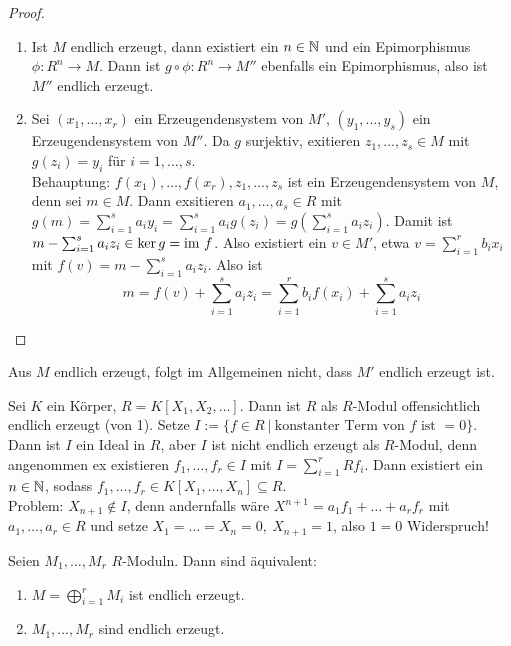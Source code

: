 \begin{proof}
	\begin{enumerate}[label=\alph*)]
		\item Ist $M$ endlich erzeugt, dann existiert ein $n\in \mathbb{N}$ und ein Epimorphismus $\phi:R^n \to M$. Dann ist $g\circ \phi:R^n \to M''$ ebenfalls ein Epimorphismus, also ist $M''$ endlich erzeugt.
		\item Sei $(x_1, \ldots, x_r)$ ein Erzeugendensystem von $M'$, $(y_1, \ldots, y_s)$ ein Erzeugendensystem von $M''$. Da $g$ surjektiv, exitieren $z_1, \ldots, z_s\in M$ mit $g(z_i) = y_i$ für $i=1, \ldots, s$. \\
		Behauptung: $f(x_1), \ldots, f(x_r), z_1, \ldots, z_s$ ist ein Erzeugendensystem von $M$, denn sei $m\in M$. Dann exsitieren $a_1, \ldots, a_s\in R$ mit $g(m) = \sum_{i=1}^s a_i y_i = \sum_{i=1}^s a_i g(z_i) = g(\sum_{i=1}^s a_i z_i)$. Damit ist $m- \sum_{i=1}^s a_i z_i \in \ker g = \operatorname{\text{im}\,} f$. Also existiert ein $v\in M'$, etwa $v= \sum_{i=1}^r b_i x_i$ mit $f(v) = m - \sum_{i=1}^s a_i z_i $. Also ist 
		$$m=f(v) + \sum_{i=1}^sa_i z_i = \sum_{i=1}^r b_i f(x_i) + \sum_{i=1}^s a_i z_i$$ 
	\end{enumerate}
\end{proof}
\begin{anm}
	Aus $M$ endlich erzeugt, folgt im Allgemeinen nicht, dass $M'$ endlich erzeugt ist.
\end{anm}
\begin{bsp}
	Sei $K$ ein Körper, $R=K[X_1, X_2, \ldots]$. Dann ist $R$ als $R$-Modul offensichtlich endlich erzeugt (von 1). Setze $I:= \{f\in R \ | \ \text{konstanter Term von } f \text{ ist } =0\}$. Dann ist $I$ ein Ideal in $R$, aber $I$ ist nicht endlich erzeugt als $R$-Modul, denn angenommen ex existieren $f_1, \ldots, f_r\in I$ mit $I = \sum_{i=1}^rRf_i$. Dann existiert ein $n\in \mathbb{N}$, sodass $f_1, \ldots, f_r\in K[X_1, \ldots, X_n] \subseteq R$. \\
	Problem: $X_{n+1} \notin I$, denn andernfalls wäre $X^{n+1} = a_1 f_1 + \ldots + a_rf_r$ mit $a_1, \ldots, a_r \in R$ und setze $X_1 = \ldots = X_n = 0, \ X_{n+1} = 1$, also $1=0$ Widerspruch!		
\end{bsp}
\begin{bem}
	Seien $M_1, \ldots, M_r$ $R$-Moduln. Dann sind äquivalent:
	\begin{enumerate}[label=\roman*)]
		\item $M= \bigoplus_{i=1}^r M_i$ ist endlich erzeugt.
		\item $M_1, \ldots, M_r$ sind endlich erzeugt.
	\end{enumerate}
\end{bem}
